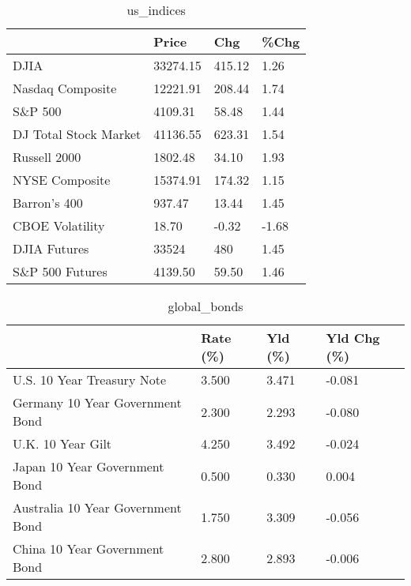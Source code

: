 \documentclass{article}%
\begin{document}
%


\begin{table}[htbp]%
\caption{us\_indices}%
\centering%
\begin{adjustbox}{width=1\textwidth}%
\begin{tabular}{llll}
\toprule
                      &    Price &    Chg &  \%Chg \\
\midrule
                 DJIA & 33274.15 & 415.12 &  1.26 \\
     Nasdaq Composite & 12221.91 & 208.44 &  1.74 \\
              S\&P 500 &  4109.31 &  58.48 &  1.44 \\
DJ Total Stock Market & 41136.55 & 623.31 &  1.54 \\
         Russell 2000 &  1802.48 &  34.10 &  1.93 \\
       NYSE Composite & 15374.91 & 174.32 &  1.15 \\
         Barron's 400 &   937.47 &  13.44 &  1.45 \\
      CBOE Volatility &    18.70 &  -0.32 & -1.68 \\
         DJIA Futures &    33524 &    480 &  1.45 \\
      S\&P 500 Futures &  4139.50 &  59.50 &  1.46 \\
\bottomrule
\end{tabular}
%
\end{adjustbox}%
\end{table}

%


\begin{table}[htbp]%
\caption{global\_bonds}%
\centering%
\begin{adjustbox}{width=1\textwidth}%
\begin{tabular}{llll}
\toprule
                                  & Rate (\%) & Yld (\%) & Yld Chg (\%) \\
\midrule
       U.S. 10 Year Treasury Note &    3.500 &   3.471 &      -0.081 \\
  Germany 10 Year Government Bond &    2.300 &   2.293 &      -0.080 \\
                U.K. 10 Year Gilt &    4.250 &   3.492 &      -0.024 \\
    Japan 10 Year Government Bond &    0.500 &   0.330 &       0.004 \\
Australia 10 Year Government Bond &    1.750 &   3.309 &      -0.056 \\
    China 10 Year Government Bond &    2.800 &   2.893 &      -0.006 \\
\bottomrule
\end{tabular}
%
\end{adjustbox}%
\end{table}
\end{document}
